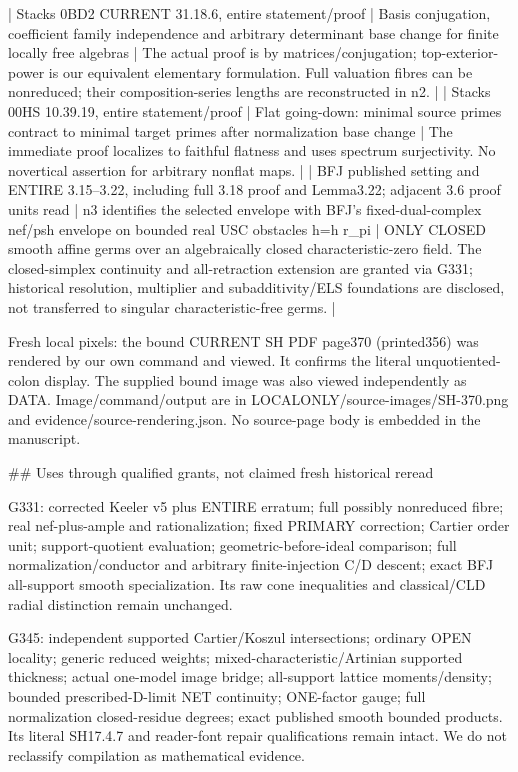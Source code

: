 \documentclass[11pt]{article}
\begin{document}
\begin{ReviewBody}
| Stacks 0BD2 CURRENT 31.18.6, entire statement/proof | Basis conjugation, coefficient family independence and arbitrary determinant base change for finite locally free algebras | The actual proof is by matrices/conjugation; top-exterior-power is our equivalent elementary formulation. Full valuation fibres can be nonreduced; their composition-series lengths are reconstructed in n2. |
| Stacks 00HS 10.39.19, entire statement/proof | Flat going-down: minimal source primes contract to minimal target primes after normalization base change | The immediate proof localizes to faithful flatness and uses spectrum surjectivity. No novertical assertion for arbitrary nonflat maps. |
| BFJ published setting and ENTIRE 3.15--3.22, including full 3.18 proof and Lemma3.22; adjacent 3.6 proof units read | n3 identifies the selected envelope with BFJ's fixed-dual-complex nef/psh envelope on bounded real USC obstacles h=h r_pi | ONLY CLOSED smooth affine germs over an algebraically closed characteristic-zero field. The closed-simplex continuity and all-retraction extension are granted via G331; historical resolution, multiplier and subadditivity/ELS foundations are disclosed, not transferred to singular characteristic-free germs. |

Fresh local pixels: the bound CURRENT SH PDF page370 (printed356) was rendered by our own command and viewed. It confirms the literal unquotiented-colon display. The supplied bound image was also viewed independently as DATA. Image/command/output are in LOCALONLY/source-images/SH-370.png and evidence/source-rendering.json. No source-page body is embedded in the manuscript.

## Uses through qualified grants, not claimed fresh historical reread

G331: corrected Keeler v5 plus ENTIRE erratum; full possibly nonreduced fibre; real nef-plus-ample and rationalization; fixed PRIMARY correction; Cartier order unit; support-quotient evaluation; geometric-before-ideal comparison; full normalization/conductor and arbitrary finite-injection C/D descent; exact BFJ all-support smooth specialization. Its raw cone inequalities and classical/CLD radial distinction remain unchanged.

G345: independent supported Cartier/Koszul intersections; ordinary OPEN locality; generic reduced weights; mixed-characteristic/Artinian supported thickness; actual one-model image bridge; all-support lattice moments/density; bounded prescribed-D-limit NET continuity; ONE-factor gauge; full normalization closed-residue degrees; exact published smooth bounded products. Its literal SH17.4.7 and reader-font repair qualifications remain intact. We do not reclassify compilation as mathematical evidence.


\end{ReviewBody}
\end{document}
